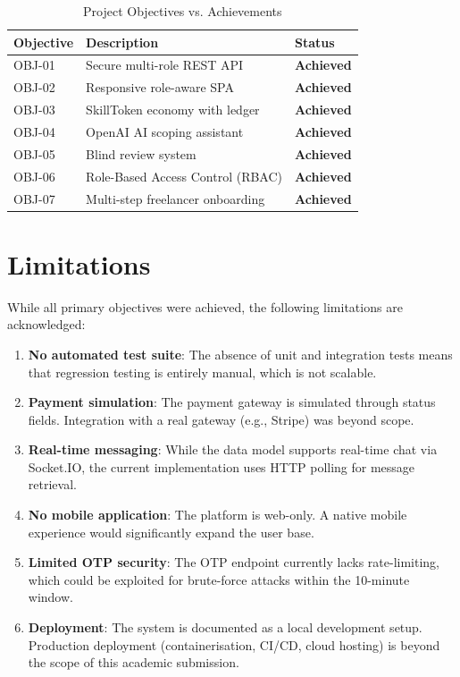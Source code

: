 \begin{table}[H]
\centering
\caption{Project Objectives vs. Achievements}
\begin{tabularx}{\textwidth}{lXl}
\toprule
\textbf{Objective} & \textbf{Description} & \textbf{Status} \\
\midrule
OBJ-01 & Secure multi-role REST API                        & \textbf{Achieved} \\
OBJ-02 & Responsive role-aware SPA                         & \textbf{Achieved} \\
OBJ-03 & SkillToken economy with ledger                    & \textbf{Achieved} \\
OBJ-04 & OpenAI AI scoping assistant                       & \textbf{Achieved} \\
OBJ-05 & Blind review system                               & \textbf{Achieved} \\
OBJ-06 & Role-Based Access Control (RBAC)                  & \textbf{Achieved} \\
OBJ-07 & Multi-step freelancer onboarding                  & \textbf{Achieved} \\
\bottomrule
\end{tabularx}
\end{table}

\section{Limitations}

While all primary objectives were achieved, the following limitations are acknowledged:

\begin{enumerate}
  \item \textbf{No automated test suite}: The absence of unit and integration tests means that regression testing is entirely manual, which is not scalable.
  \item \textbf{Payment simulation}: The payment gateway is simulated through status fields. Integration with a real gateway (e.g., Stripe) was beyond scope.
  \item \textbf{Real-time messaging}: While the data model supports real-time chat via Socket.IO, the current implementation uses HTTP polling for message retrieval.
  \item \textbf{No mobile application}: The platform is web-only. A native mobile experience would significantly expand the user base.
  \item \textbf{Limited OTP security}: The OTP endpoint currently lacks rate-limiting, which could be exploited for brute-force attacks within the 10-minute window.
  \item \textbf{Deployment}: The system is documented as a local development setup. Production deployment (containerisation, CI/CD, cloud hosting) is beyond the scope of this academic submission.
\end{enumerate}

